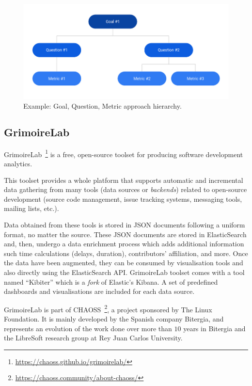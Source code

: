 \documentclass[a4paper, 12pt]{book}
\begin{document}
\begin{figure}
 \centering
  \includegraphics[width=12cm, keepaspectratio]{img/example-gqm-schema}
  \caption{Example: Goal, Question, Metric approach hierarchy.}
  \label{fig:example-gqm-schema}
\end{figure}

\subsection{GrimoireLab}
\label{ssec:GrimoireLab}
GrimoireLab~\footnote{\url{https://chaoss.github.io/grimoirelab/}} is a free, open-source toolset for producing software development analytics.

This toolset provides a whole platform that supports automatic and incremental data gathering from many tools (data sources or \emph{backends}) related to open-source development (source code management, issue tracking systems, messaging tools, mailing lists, etc.).

Data obtained from these tools is stored in JSON documents following a uniform format, no matter the source. These JSON documents are stored in ElasticSearch and, then, undergo a data enrichment process which adds additional information such time calculations (delays, duration), contributors' affiliation, and more.
Once the data have been augmented, they can be consumed by visualisation tools and also directly using the ElasticSearch API. GrimoireLab toolset comes with a tool named ``Kibiter'' which is a \emph{fork} of Elastic's Kibana. A set of predefined dashboards and visualisations are included for each data source.  

GrimoireLab is part of CHAOSS~\footnote{\url{https://chaoss.community/about-chaoss/}}, a project sponsored by The Linux Foundation. It is mainly developed by the Spanish company Bitergia, and represents an evolution of the work done over more than $10$ years in Bitergia and the LibreSoft research group at Rey Juan Carlos University.
\end{document}
